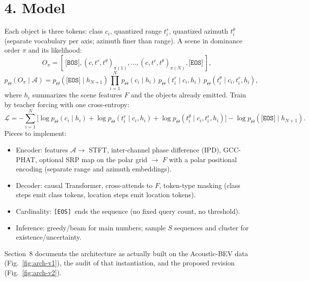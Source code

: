 \documentclass[10pt]{article}
\newcommand{\A}{\mathcal{A}}
\newcommand{\bos}{\texttt{[BOS]}}
\newcommand{\eos}{\texttt{[EOS]}}
\begin{document}
\section*{4. Model}
Each object is three tokens: class $c_i$, quantized range $t^r_i$, quantized
azimuth $t^\theta_i$ (separate vocabulary per axis; azimuth finer than range). A
scene in dominance order $\pi$ and its likelihood:
\begin{equation}
O_\pi=[\,\bos,(c,t^r,t^\theta)_{\pi(1)},\dots,(c,t^r,t^\theta)_{\pi(N)},\eos\,],
\end{equation}
\begin{equation}
p_\Theta(O_\pi\mid\A)=p_\Theta(\eos\mid h_{N+1})\prod_{i=1}^{N}
p_\Theta(c_i\mid h_i)\,p_\Theta(t^r_i\mid c_i,h_i)\,p_\Theta(t^\theta_i\mid c_i,t^r_i,h_i),
\end{equation}
where $h_i$ summarizes the scene features $F$ and the objects already emitted.
Train by teacher forcing with one cross-entropy:
\begin{equation}
\mathcal{L}=-\sum_{i=1}^{N}\big[\log p_\Theta(c_i\mid h_i)+\log p_\Theta(t^r_i\mid c_i,h_i)+\log p_\Theta(t^\theta_i\mid c_i,t^r_i,h_i)\big]-\log p_\Theta(\eos\mid h_{N+1}).
\end{equation}
Pieces to implement:
\begin{itemize}
\item Encoder: features $\A\to$ STFT, inter-channel phase difference (IPD),
GCC-PHAT, optional SRP map on the polar grid $\to$ $F$ with a polar positional
encoding (separate range and azimuth embeddings).
\item Decoder: causal Transformer, cross-attends to $F$, token-type masking (class
steps emit class tokens, location steps emit location tokens).
\item Cardinality: \eos\ ends the sequence (no fixed query count, no threshold).
\item Inference: greedy/beam for main numbers; sample $S$ sequences and cluster for
existence/uncertainty.
\end{itemize}
Section~8 documents the architecture as actually built on the Acoustic-BEV data
(Fig.~\ref{fig:arch-v1}), the audit of that instantiation, and the proposed
revision (Fig.~\ref{fig:arch-v2}).
\end{document}
